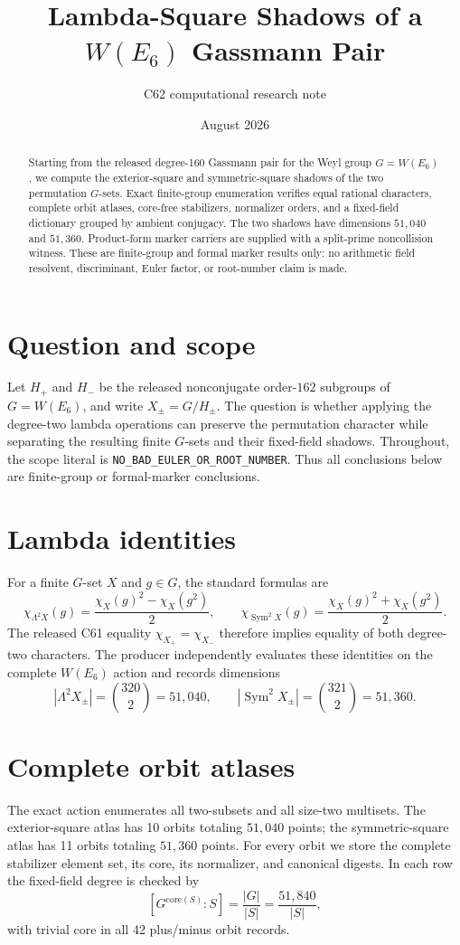 \documentclass[11pt]{article}
\title{Lambda-Square Shadows of a \texorpdfstring{$W(E_6)$}{W(E6)} Gassmann Pair}
\author{C62 computational research note}
\date{August 2026}
\begin{document}
\maketitle

\begin{abstract}
Starting from the released degree-160 Gassmann pair for the Weyl group
$G=W(E_6)$, we compute the exterior-square and symmetric-square shadows of
the two permutation $G$-sets.  Exact finite-group enumeration verifies equal
rational characters, complete orbit atlases, core-free stabilizers, normalizer
orders, and a fixed-field dictionary grouped by ambient conjugacy.  The two
shadows have dimensions $51{,}040$ and $51{,}360$.  Product-form marker
carriers are supplied with a split-prime noncollision witness.  These are
finite-group and formal marker results only: no arithmetic field resolvent,
discriminant, Euler factor, or root-number claim is made.
\end{abstract}

\section{Question and scope}
Let $H_+$ and $H_-$ be the released nonconjugate order-$162$ subgroups of
$G=W(E_6)$, and write $X_\pm=G/H_\pm$.  The question is whether applying the
degree-two lambda operations can preserve the permutation character while
separating the resulting finite $G$-sets and their fixed-field shadows.
Throughout, the scope literal is
\texttt{NO\_BAD\_EULER\_OR\_ROOT\_NUMBER}.  Thus all conclusions below are
finite-group or formal-marker conclusions.

\section{Lambda identities}
For a finite $G$-set $X$ and $g\in G$, the standard formulas are
\[
 \chi_{\Lambda^2 X}(g)=\frac{\chi_X(g)^2-\chi_X(g^2)}2,
 \qquad
 \chi_{\operatorname{Sym}^2X}(g)=\frac{\chi_X(g)^2+\chi_X(g^2)}2.
\]
The released C61 equality $\chi_{X_+}=\chi_{X_-}$ therefore implies equality
of both degree-two characters.  The producer independently evaluates these
identities on the complete $W(E_6)$ action and records dimensions
\[
 |\Lambda^2X_\pm|=\binom{320}{2}=51{,}040,
 \qquad |\operatorname{Sym}^2X_\pm|=\binom{321}{2}=51{,}360.
\]

\section{Complete orbit atlases}
The exact action enumerates all two-subsets and all size-two multisets.  The
exterior-square atlas has 10 orbits totaling $51{,}040$ points; the
symmetric-square atlas has 11 orbits totaling $51{,}360$ points.  For every
orbit we store the complete stabilizer element set, its core, its normalizer,
and canonical digests.  In each row the fixed-field degree is checked by
\[
 [G^{\mathrm{core}(S)}:S]=\frac{|G|}{|S|}=\frac{51{,}840}{|S|},
\]
with trivial core in all 42 plus/minus orbit records.
\end{document}
